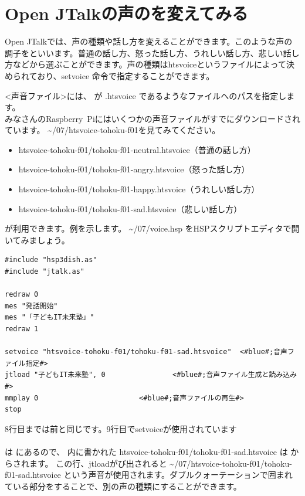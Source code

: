 \documentclass[text06.tex]{subfiles}
\begin{document}
\newpage
\section{Open JTalkの声のを変えてみる}
Open JTalkでは、声の種類や話し方を変えることができます。このような声の調子をといいます。普通の話し方、怒った話し方、うれしい話し方、悲しい話し方などから選ぶことができます。声の種類はhtsvoiceというファイルによって決められており、setvoice 命令で指定することができます。\\

<声音ファイル>には、 が .htsvoice であるようなファイルへのパスを指定します。\\
みなさんの\mbox{Raspberry Pi}にはいくつかの声音ファイルがすでにダウンロードされています。  \textasciitilde /07/htsvoice-tohoku-f01を見てみてください。

\begin{itemize}
\item {\ttfamily htsvoice-tohoku-f01/\allowbreak tohoku-f01-neutral.htsvoice}（普通の話し方）
\item {\ttfamily htsvoice-tohoku-f01/\allowbreak tohoku-f01-angry.htsvoice}（怒った話し方）
\item {\ttfamily htsvoice-tohoku-f01/\allowbreak tohoku-f01-happy.htsvoice}（うれしい話し方）
\item {\ttfamily htsvoice-tohoku-f01/\allowbreak tohoku-f01-sad.htsvoice}（悲しい話し方）
\end{itemize}

が利用できます。例を示します。 \textasciitilde /07/voice.hsp をHSPスクリプトエディタで開いてみましょう。\\

\begin{lstlisting}[caption=voice.hsp,label=voice.hsp]
#include "hsp3dish.as"
#include "jtalk.as"

redraw 0
mes "発話開始"
mes "「子どもIT未来塾」"
redraw 1

setvoice "htsvoice-tohoku-f01/tohoku-f01-sad.htsvoice"	<#blue#;音声ファイル指定#>
jtload "子どもIT未来塾", 0				<#blue#;音声ファイル生成と読み込み#>
mmplay 0						<#blue#;音声ファイルの再生#>
stop
\end{lstlisting}

8行目までは前と同じです。9行目でsetvoiceが使用されています\\
\\
 は  にあるので、
 内に書かれた {\ttfamily htsvoice-tohoku-f01/\allowbreak tohoku-f01-sad.htsvoice}
は  からされます。
この行、jtloadがび出されると {\ttfamily \textasciitilde /07/htsvoice-tohoku-f01/\allowbreak tohoku-f01-sad.htsvoice}
という声音が使用されます。ダブルクォーテーションで囲まれている部分をすることで、別の声の種類にすることができます。\\

\begin{tcolorbox}[title=\useOmetoi]
\begin{enumerate}
\end{enumerate}
\end{tcolorbox}
\end{document}

